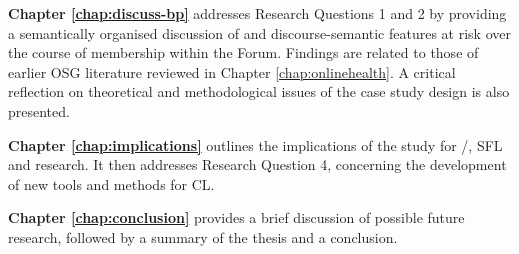 \noindent\textbf{Chapter \ref{chap:discuss-bp}} addresses Research Questions 1 and 2 by providing a semantically organised discussion of  and \gls{discourse-semantic} features at risk over the course of membership within the \gls{Forum}. Findings are related to those of earlier \gls{OSG} literature reviewed in Chapter \ref{chap:onlinehealth}. A critical reflection on theoretical and methodological issues of the case study design is also presented.

\noindent\textbf{Chapter \ref{chap:implications}} outlines the implications of the study for \slash {}, \gls{SFL} and  research. It then addresses Research Question 4, concerning the development of new tools and methods for \gls{CL}.

\noindent\textbf{Chapter \ref{chap:conclusion}} provides a brief discussion of possible future research, followed by a summary of the thesis and a conclusion.
